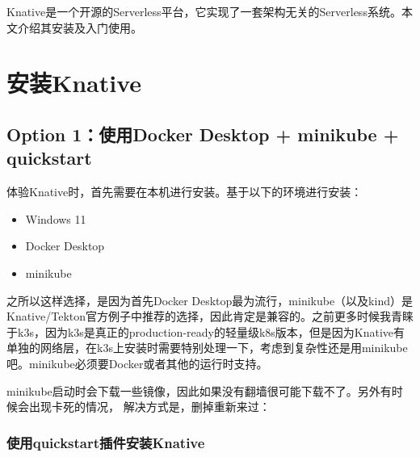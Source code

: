 \documentclass[12pt]{article}
\begin{document}
\makeblogtitle

Knative是一个开源的Serverless平台，它实现了一套架构无关的Serverless系统。本文介绍其安装及入门使用。

\section{安装Knative}\label{ux5b89ux88c5knative}

\subsection{Option 1：使用Docker Desktop + minikube + quickstart}\label{option-1ux4f7fux7528docker-desktop-minikube-quickstart}

体验Knative时，首先需要在本机进行安装。基于以下的环境进行安装：

\begin{itemize}
\tightlist
\item
  Windows 11
\item
  Docker Desktop
\item
  minikube
\end{itemize}

之所以这样选择，是因为首先Docker Desktop最为流行，minikube（以及kind）是Knative/Tekton官方例子中推荐的选择，因此肯定是兼容的。之前更多时候我青睐于k3s，因为k3s是真正的production-ready的轻量级k8s版本，但是因为Knative有单独的网络层，在k3s上安装时需要特别处理一下，考虑到复杂性还是用minikube吧。minikube必须要Docker或者其他的运行时支持。

\begin{Shaded}
\begin{Highlighting}[]
\end{Highlighting}
\end{Shaded}

minikube启动时会下载一些镜像，因此如果没有翻墙很可能下载不了。另外有时候会出现卡死的情况， 解决方式是，删掉重新来过：

\begin{Shaded}
\begin{Highlighting}[]
 
\end{Highlighting}
\end{Shaded}

\subsubsection{使用quickstart插件安装Knative}\label{ux4f7fux7528quickstartux63d2ux4ef6ux5b89ux88c5knative}
\end{document}
